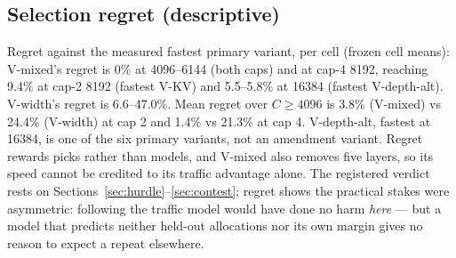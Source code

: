 \documentclass[10pt,letterpaper,twocolumn]{article}
\begin{document}
\subsection{Selection regret (descriptive)}
\label{sec:regret}
Regret against the measured fastest primary variant, per cell
(frozen cell means): V-mixed's regret is 0\% at 4096--6144 (both
caps) and at cap-4 8192, reaching 9.4\% at cap-2 8192 (fastest
V-KV) and 5.5--5.8\% at 16384 (fastest V-depth-alt). V-width's
regret is 6.6--47.0\%. Mean regret over $C\geq4096$ is 3.8\%
(V-mixed) vs 24.4\% (V-width) at cap 2 and 1.4\% vs 21.3\% at
cap 4. V-depth-alt, fastest at 16384, is one of the six
primary variants, not an amendment variant. Regret rewards picks rather than models, and V-mixed also
removes five layers, so its speed cannot be credited to its
traffic advantage alone. The registered verdict rests on
Sections~\ref{sec:hurdle}--\ref{sec:contest}; regret shows the
practical stakes were asymmetric: following the traffic model
would have done no harm \emph{here} --- but a model that predicts
neither held-out allocations nor its own margin gives no reason
to expect a repeat elsewhere.
\end{document}
